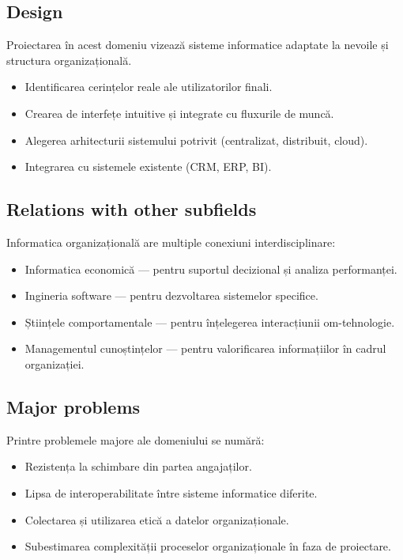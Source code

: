 \documentclass[12pt, letterpaper]{article}
\begin{document}
\subsection*{Design}
Proiectarea în acest domeniu vizează sisteme informatice adaptate la nevoile și structura organizațională.
\begin{itemize}
    \item Identificarea cerințelor reale ale utilizatorilor finali.
    \item Crearea de interfețe intuitive și integrate cu fluxurile de muncă.
    \item Alegerea arhitecturii sistemului potrivit (centralizat, distribuit, cloud).
    \item Integrarea cu sistemele existente (CRM, ERP, BI).
\end{itemize}

\subsection*{Relations with other subfields}
Informatica organizațională are multiple conexiuni interdisciplinare:
\begin{itemize}
    \item Informatica economică — pentru suportul decizional și analiza performanței.
    \item Ingineria software — pentru dezvoltarea sistemelor specifice.
    \item Științele comportamentale — pentru înțelegerea interacțiunii om-tehnologie.
    \item Managementul cunoștințelor — pentru valorificarea informațiilor în cadrul organizației.
\end{itemize}

\subsection*{Major problems}
Printre problemele majore ale domeniului se numără:
\begin{itemize}
    \item Rezistența la schimbare din partea angajaților.
    \item Lipsa de interoperabilitate între sisteme informatice diferite.
    \item Colectarea și utilizarea etică a datelor organizaționale.
    \item Subestimarea complexității proceselor organizaționale în faza de proiectare.
\end{itemize}
\end{document}
